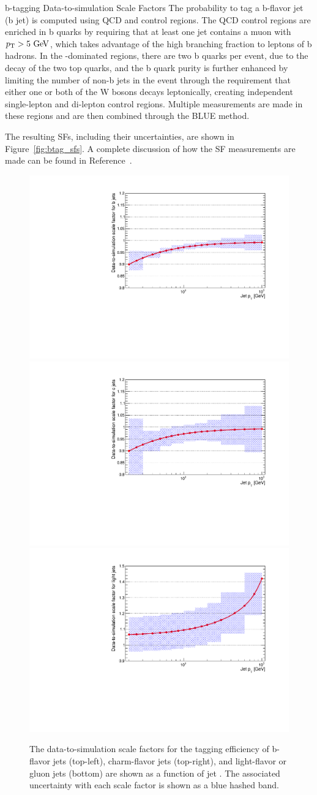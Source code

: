 \begin{section}{b-tagging Data-to-simulation Scale Factors}
The probability to tag a b-flavor jet (b jet) is computed using QCD and \ttbar control regions.
The QCD control regions are enriched in b quarks by requiring that at least one jet contains a muon with $p_{\mathrm{T}} > 5~\mathrm{Ge\kern -0.1em V}$, which takes advantage of the high branching fraction to leptons of b hadrons.
In the \ttbar-dominated regions, there are two b quarks per event, due to the decay of the two top quarks, and the b quark purity is further enhanced by limiting the number of non-b jets in the event through the requirement that either one or both of the W bosons decays leptonically, creating independent single-lepton and di-lepton control regions.
Multiple measurements are made in these regions and are then combined through the BLUE method.

The resulting SFs, including their uncertainties, are shown in Figure~\ref{fig:btag_sfs}.
A complete discussion of how the SF measurements are made can be found in Reference~\cite{Sirunyan:2017ezt}.

\begin{figure}[tbp!]
\begin{center}
\includegraphics[angle=0,width=0.45\columnwidth]{fig/sfs_bjet.pdf}
\includegraphics[angle=0,width=0.45\columnwidth]{fig/sfs_cjet.pdf}
\includegraphics[angle=0,width=0.45\columnwidth]{fig/sfs_ljet.pdf}
\end{center}
\caption{The data-to-simulation scale factors for the tagging efficiency of b-flavor jets (top-left), charm-flavor jets (top-right), and light-flavor or gluon jets (bottom) are shown as a function of jet \pT.
The associated uncertainty with each scale factor is shown as a blue hashed band.}
\label{fig:bkg_sys_tables}
\end{figure}


\end{section}
